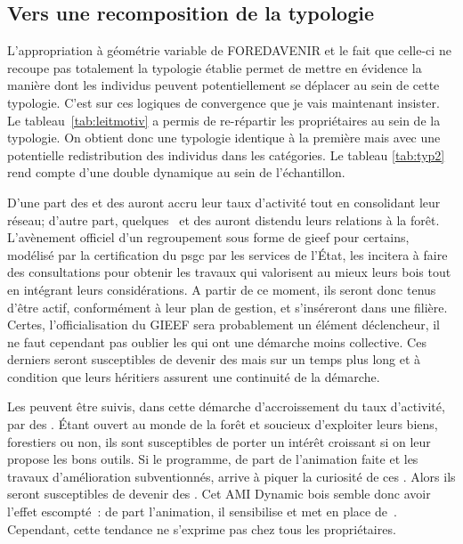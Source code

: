 \documentclass[12pt]{report}
\newcounter{table1}
\newcommand\indexp[1]{#1\index{#1}}
\begin{document}
\subsection{Vers une recomposition de la typologie}

L’appropriation à géométrie variable de FOREDAVENIR et le fait que celle-ci ne
recoupe pas totalement la typologie établie permet de mettre en évidence la
manière dont les individus peuvent potentiellement se déplacer au sein de cette
typologie. C’est sur ces logiques de convergence que je vais maintenant
insister.\\

Le tableau~\ref{tab:leitmotiv} a permis de re-répartir les propriétaires au sein
de la typologie. On obtient donc une typologie identique à la première mais avec
une potentielle redistribution des individus dans les catégories. Le tableau
\ref{tab:typ2} rend compte d'une double dynamique au sein de l'échantillon.

D'une part des  et des 
auront accru leur taux d'activité tout en consolidant leur réseau; d'autre part,
quelques~ et des 
auront distendu leurs relations à la forêt.\\

L'avènement officiel d'un regroupement sous forme de \gls{gieef}
pour certains, modélisé par la
certification du \gls{psgc} par les services de l’État, les incitera à faire des
consultations pour obtenir les travaux qui valorisent au mieux leurs bois tout
en intégrant leurs considérations. A partir de ce moment, ils seront donc tenus
d'être actif, conformément à leur plan de gestion, et s'inséreront dans une
filière. Certes, l'officialisation du GIEEF sera probablement un élément
déclencheur, il ne faut cependant pas oublier les 
qui ont une démarche moins collective. Ces derniers seront susceptibles de devenir
des  mais sur un temps plus long et à
condition que leurs héritiers assurent une continuité de la démarche.

Les  peuvent être suivis, dans cette démarche
d'accroissement du taux d'activité, par des . Étant
ouvert au monde de la forêt et soucieux d'exploiter leurs biens, forestiers ou
non, ils sont susceptibles de porter un intérêt croissant si on leur propose les
bons outils. Si le programme, de part de l'animation faite et les travaux
d'amélioration subventionnés, arrive à piquer la curiosité de ces
. Alors ils seront susceptibles de devenir des
. Cet \indexp{AMI} Dynamic bois semble donc
avoir l'effet escompté~: de part l'animation, il sensibilise
 et met en
place de~. Cependant, cette
tendance ne s'exprime pas chez tous les propriétaires.\\
\end{document}
